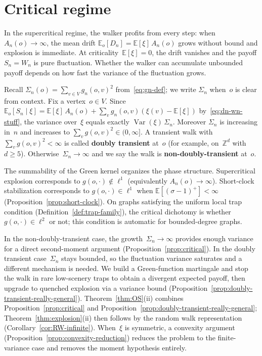 \documentclass[aop]{imsart}
\theoremstyle{plain}
\theoremstyle{definition}
\newcommand{\Z}{\mathbb{Z}}
\newcommand{\E}{\mathbb{E}}
\DeclareMathOperator{\var}{Var}
\begin{document}
	
	\section{Critical regime}\label{sec:critical}
	
	In the supercritical regime, the walker profits from every step: when $A_n(o)\to\infty$, the mean drift $\E_o[D_n]=\E[\xi]\,A_n(o)$ grows without bound and explosion is immediate. At criticality~$\E[\xi]=0$, the drift vanishes and the payoff $S_n = W_n$ is pure fluctuation. Whether the walker can accumulate unbounded payoff depends on how fast the variance of the fluctuation grows.
	
	Recall $\Sigma_n(o)=\sum_{v\in V} g_n(o,v)^2$ from~\eqref{eq:gn-def}; we write $\Sigma_n$ when~$o$ is clear from context. Fix a vertex~$o\in V$.
	Since~$\E_o[S_n\mid\xi]=\E[\xi]\,A_n(o)+\sum_v g_n(o,v)(\xi(v)-\E[\xi])$ by~\eqref{eq:dn-wn-stuff}, the variance over~$\xi$ equals exactly $\var(\xi)\,\Sigma_n$. Moreover $\Sigma_n$ is increasing in~$n$ and increases to $\sum_v g(o,v)^2\in(0,\infty]$.
	A transient walk with~$\sum_v g(o,v)^2<\infty$ is called \textbf{doubly transient} at~$o$ (for example, on~$\Z^d$ with $d\geq 5$). Otherwise~$\Sigma_n\to\infty$ and we say the walk is \textbf{non-doubly-transient} at~$o$.
	
	The summability of the Green kernel organizes the phase structure. Supercritical explosion corresponds to $g(o,\cdot)\notin\ell^1$ (equivalently $A_n(o)\to\infty$). Short-clock stabilization corresponds to $g(o,\cdot)\in\ell^1$ when $\E[(\sigma-1)^+]<\infty$ (Proposition~\ref{prop:short-clock}). On graphs satisfying the uniform local trap condition (Definition~\ref{def:trap-family}), the critical dichotomy is whether $g(o,\cdot)\in\ell^2$ or not; this condition is automatic for bounded-degree graphs.
	
	In the non-doubly-transient case, the growth~$\Sigma_n\to\infty$ provides enough variance for a direct second-moment argument (Proposition~\ref{prop:critical}).
	In the doubly transient case~$\Sigma_n$ stays bounded, so the fluctuation variance saturates and a different mechanism is needed.
	We build a Green-function martingale and stop the walk in rare low-scenery traps to obtain a divergent expected payoff, then upgrade to quenched explosion via a variance bound (Proposition~\ref{prop:doubly-transient-really-general}).
	Theorem~\ref{thm:OS}(ii) combines Proposition~\ref{prop:critical} and Proposition~\ref{prop:doubly-transient-really-general}; Theorem~\ref{thm:explosion}(ii) then follows by the random walk representation (Corollary~\ref{cor:RW-infinite}).
	When~$\xi$ is symmetric, a convexity argument (Proposition~\ref{prop:convexity-reduction}) reduces the problem to the finite-variance case and removes the moment hypothesis entirely.
	
\end{document}
